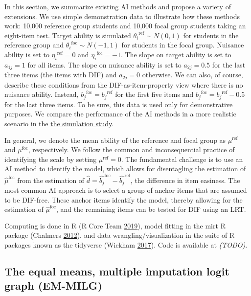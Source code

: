 \documentclass[
  11pt,
]{article}
\begin{document}
In this section, we summarize existing AI methods and propose a variety of extensions. We use simple demonstration data to illustrate how these methods work: 10,000 reference group students and 10,000 focal group students taking an eight-item test. Target ability is simulated \({\theta_i}^{\text{ref}} \sim N(0,1)\) for students in the reference group and \({\theta_i}^{\text{foc}} \sim N(-1,1)\) for students in the focal group. Nuisance ability is set to \({\eta_i}^{\text{ref}} = 0\) and \({\eta_i}^{\text{foc}} = -1\). The slope on target ability is set to \(a_{1j} = 1\) for all items. The slope on nuisance ability is set to \(a_{2j} = 0.5\) for the last three items (the items with DIF) and \(a_{2j} = 0\) otherwise. We can also, of course, describe these conditions from the DIF-as-item-property view where there is no nuisance ability. Instead, \({b_j}^{\text{foc}} = {b_j}^{\text{ref}}\) for the first five items and \({b_j}^{\text{foc}} = {b_j}^{\text{ref}} - 0.5\) for the last three items. To be sure, this data is used only for demonstrative purposes. We compare the performance of the AI methods in a more realistic scenario in the \protect\hyperlink{simstudy}{the simulation study}.

In general, we denote the mean ability of the reference and focal group as \(\mu^\text{ref}\) and \(\mu^\text{foc}\), respectively. We follow the common and inconsequential practice of identifying the scale by setting \(\mu^\text{ref} = 0\). The fundamental challenge is to use an AI method to identify the model, which allows for disentagling the estimation of \(\hat\mu^\text{foc}\) from the estimation of \(\hat d = \hat{b_j}^{\text{foc}} - \hat{b_j}^{\text{ref}}\), the difference in item easiness. The most common AI approach is to select a group of anchor items that are assumed to be DIF-free. These anchor items identify the model, thereby allowing for the estimation of \(\hat\mu^\text{foc}\), and the remaining items can be tested for DIF using an LRT.

Computing is done in R (R Core Team \protect\hyperlink{ref-rcore}{2019}), model fitting in the mirt R package (Chalmers \protect\hyperlink{ref-chalmers2012mirt}{2012}), and data wrangling/visualization in the suite of R packages known as the tidyverse (Wickham \protect\hyperlink{ref-tidy}{2017}). Code is available at \emph{(TODO)}.

\hypertarget{emmilg}{%
\subsection{The equal means, multiple imputation logit graph (EM-MILG)}\label{emmilg}}
\end{document}
